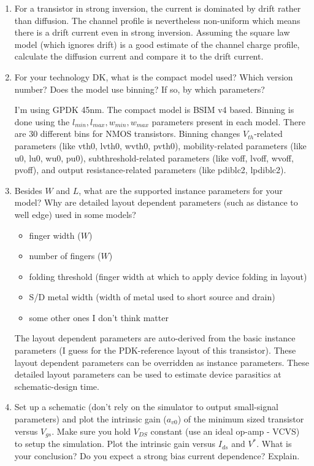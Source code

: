 \begin{enumerate}
\item {\color{blue}For a transistor in strong inversion, the current is dominated by drift rather than diffusion. The channel profile is nevertheless non-uniform which means there is a drift current even in strong inversion. Assuming the square law model (which ignores drift) is a good estimate of the channel charge profile, calculate the diffusion current and compare it to the drift current.}

\item {\color{blue}For your technology DK, what is the compact model used? Which version number? Does the model use binning? If so, by which parameters?}

I'm using GPDK 45nm. The compact model is BSIM v4 based. Binning is done using the $l_{min}, l_{max}, w_{min}, w_{max}$ parameters present in each model. There are 30 different bins for NMOS transistors. Binning changes $V_{th}$-related parameters (like vth0, lvth0, wvth0, pvth0), mobility-related parameters (like u0, lu0, wu0, pu0), subthreshold-related parameters (like voff, lvoff, wvoff, pvoff), and output resistance-related parameters (like pdiblc2, lpdiblc2).

\item {\color{blue}Besides $W$ and $L$, what are the supported instance parameters for your model? Why are detailed layout dependent parameters (such as distance to well edge) used in some models?}

    \begin{itemize}
        \item finger width ($W$)
        \item number of fingers ($W$)
        \item folding threshold (finger width at which to apply device folding in layout)
        \item S/D metal width (width of metal used to short source and drain)
        \item some other ones I don't think matter
    \end{itemize}

    The layout dependent parameters are auto-derived from the basic instance parameters (I guess for the PDK-reference layout of this transistor). These layout dependent parameters can be overridden as instance parameters. These detailed layout parameters can be used to estimate device parasitics at schematic-design time.

\item {\color{blue}Set up a schematic (don't rely on the simulator to output small-signal parameters) and plot the intrinsic gain ($a_{v0}$) of the minimum sized transistor versus $V_{gs}$. Make sure you hold $V_{DS}$ constant (use an ideal op-amp - VCVS) to setup the simulation. Plot the intrinsic gain versus $I_{ds}$ and $V^*$. What is your conclusion? Do you expect a strong bias current dependence? Explain.}


\end{enumerate}

